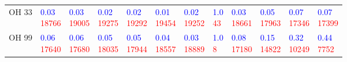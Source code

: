 \begin{tabular}{llllllllllll}
OH 33  &  \makecell{\textcolor{blue}{0.03} \\ \textcolor{red}{18766}} &  \makecell{\textcolor{blue}{0.03} \\ \textcolor{red}{19005}} &  \makecell{\textcolor{blue}{0.02} \\ \textcolor{red}{19275}} &  \makecell{\textcolor{blue}{0.02} \\ \textcolor{red}{19292}} &  \makecell{\textcolor{blue}{0.01} \\ \textcolor{red}{19454}} &  \makecell{\textcolor{blue}{0.02} \\ \textcolor{red}{19252}} &    \makecell{\textcolor{blue}{1.0} \\ \textcolor{red}{43}} &  \makecell{\textcolor{blue}{0.03} \\ \textcolor{red}{18661}} &  \makecell{\textcolor{blue}{0.05} \\ \textcolor{red}{17963}} &  \makecell{\textcolor{blue}{0.07} \\ \textcolor{red}{17346}} &  \makecell{\textcolor{blue}{0.07} \\ \textcolor{red}{17399}} \\
OH 99  &  \makecell{\textcolor{blue}{0.06} \\ \textcolor{red}{17640}} &  \makecell{\textcolor{blue}{0.06} \\ \textcolor{red}{17680}} &  \makecell{\textcolor{blue}{0.05} \\ \textcolor{red}{18035}} &  \makecell{\textcolor{blue}{0.05} \\ \textcolor{red}{17944}} &  \makecell{\textcolor{blue}{0.04} \\ \textcolor{red}{18557}} &  \makecell{\textcolor{blue}{0.03} \\ \textcolor{red}{18889}} &     \makecell{\textcolor{blue}{1.0} \\ \textcolor{red}{8}} &  \makecell{\textcolor{blue}{0.08} \\ \textcolor{red}{17180}} &  \makecell{\textcolor{blue}{0.15} \\ \textcolor{red}{14822}} &  \makecell{\textcolor{blue}{0.32} \\ \textcolor{red}{10249}} &   \makecell{\textcolor{blue}{0.44} \\ \textcolor{red}{7752}} \\

\end{tabular}

